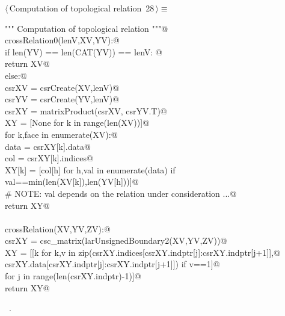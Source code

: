 \documentclass[11pt,oneside]{article}    %
\begin{document}
\begin{flushleft} \small \label{scrap47}
\protect{}$\langle\,$Computation of topological relation\nobreak\ {\footnotesize 28}$\,\rangle\equiv$
\vspace{-1ex}
\begin{list}{}{} \item
\mbox{}\verb@""" Computation of topological relation """@\\
\mbox{}\verb@def crossRelation0(lenV,XV,YV):@\\
\mbox{}\verb@    if len(YV) == len(CAT(YV)) == lenV:  @\\
\mbox{}\verb@        return XV@\\
\mbox{}\verb@    else:@\\
\mbox{}\verb@        csrXV = csrCreate(XV,lenV)@\\
\mbox{}\verb@        csrYV = csrCreate(YV,lenV)@\\
\mbox{}\verb@        csrXY = matrixProduct(csrXV, csrYV.T)@\\
\mbox{}\verb@        XY = [None for k in range(len(XV))]@\\
\mbox{}\verb@        for k,face in enumerate(XV):@\\
\mbox{}\verb@            data = csrXY[k].data@\\
\mbox{}\verb@            col = csrXY[k].indices@\\
\mbox{}\verb@            XY[k] = [col[h] for h,val in enumerate(data) if val==min(len(XV[k]),len(YV[h]))]@\\
\mbox{}\verb@            # NOTE: val depends on the relation under consideration ...@\\
\mbox{}\verb@        return XY@\\
\mbox{}\verb@@\\
\mbox{}\verb@def crossRelation(XV,YV,ZV):@\\
\mbox{}\verb@    csrXY = csc_matrix(larUnsignedBoundary2(XV,YV,ZV))@\\
\mbox{}\verb@    XY = [[k for k,v in  zip(csrXY.indices[csrXY.indptr[j]:csrXY.indptr[j+1]],@\\
\mbox{}\verb@           csrXY.data[csrXY.indptr[j]:csrXY.indptr[j+1]]) if v==1]@\\
\mbox{}\verb@          for j in range(len(csrXY.indptr)-1)]@\\
\mbox{}\verb@    return XY@\\
\mbox{}\verb@@{\NWsep}
\end{list}
\vspace{-1ex}
\footnotesize\addtolength{\baselineskip}{-1ex}
\begin{list}{}{\setlength{\itemsep}{-\parsep}\setlength{\itemindent}{-\leftmargin}}
\item \NWtxtMacroRefIn\ .
\end{list}
\end{flushleft}
\end{document}
